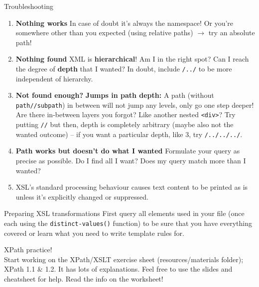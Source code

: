 \begin{frame}{Troubleshooting}
 \footnotesize
\begin{enumerate}
    \item \textbf{\lbrack{}Nothing works\rbrack} In case of doubt it's always the namespace! Or you're somewhere other than you expected (using relative paths) $\to$ try an absolute path!
    \item \textbf{\lbrack{}Nothing found\rbrack} XML is \textbf{hierarchical}! Am I in the right spot? Can I reach the degree of \textbf{depth} that I wanted? In doubt, include \verb|/../| to be more independent of hierarchy.
    \item \textbf{\lbrack{}Not found enough?\rbrack} \textbf{Jumps in path depth:} A path (without \texttt{path//subpath}) in between will not jump any levels, only go one step deeper! Are there in-between layers you forgot? Like another nested \texttt{<div>}? Try putting \texttt{//} but then, depth is completely arbitrary (maybe also not the wanted outcome) -- if you want a particular depth, like 3, try \texttt{/../../../}.
    \item \textbf{\lbrack{}Path works but doesn't do what I wanted\rbrack} 
    Formulate your query as precise as possible. Do I find all I want? Does my query match more than I wanted? 
    \item XSL's standard processing behaviour causes text content to be printed as is unless it's explicitly changed or suppressed. 
\end{enumerate}

\begin{block}{Preparing XSL transformations}\footnotesize
First query all elements used in your file (once each using the \texttt{distinct-values()} function) to be sure that you have everything covered or learn what you need to write template rules for.\medskip

\end{block}
\end{frame}



\begin{frame}[standout]
    \alert{XPath practice!} \\
    \normalsize
    Start working on the XPath/XSLT exercise sheet (resources/materials folder); XPath 1.1 \& 1.2. It has lots of explanations. Feel free to use the slides and cheatsheet for help. Read the info on the worksheet!
\end{frame}

